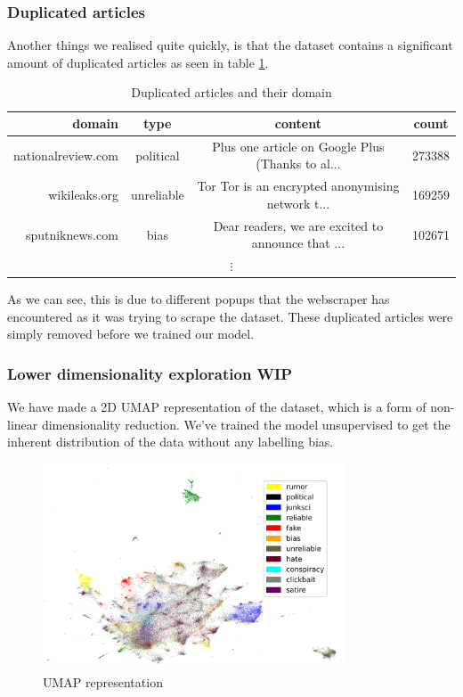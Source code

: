 \subsubsection{Duplicated articles}\label{sec:dup_articles}
Another things we realised quite quickly, is that the dataset contains a significant amount of duplicated articles as
seen in table \ref{tab:dupart}.

\begin{table}[htpb]
  \centering
  \caption{Duplicated articles and their domain}
  \label{tab:dupart}
  \begin{tabular}{r | c | c| c}
    domain & type & content & count \\ \hline
    nationalreview.com & political & Plus one article on Google Plus (Thanks to al... & 273388 \\ \hline
    wikileaks.org & unreliable & Tor Tor is an encrypted anonymising network t... & 169259 \\ \hline
    sputniknews.com & bias & Dear readers, we are excited to announce that ... & 102671 \\
    \multicolumn{4}{c}{$\vdots$}
  \end{tabular}
\end{table}
As we can see, this is due to different popups that the webscraper has encountered as it
was trying to scrape the dataset. These duplicated articles were simply removed before we trained our model.

\subsubsection{Lower dimensionality exploration WIP}
We have made a 2D UMAP representation of the dataset, which is a form of non-linear dimensionality reduction. We've
trained the model unsupervised to get the inherent distribution of the data without any labelling bias.
\begin{figure}[htpb]
  \centering
  \includegraphics[width=0.8\textwidth]{figures/umapFakeNewsClasses}
  \caption{UMAP representation}
  \label{fig:umap_explore}
\end{figure}

